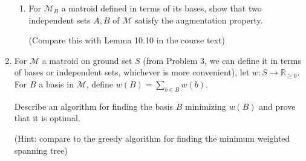 \documentclass[11pt,letterpaper]{article}
\begin{document}
\begin{enumerate}
\begin{enumerate}
        \item For $\mathcal{M}_B$ a matroid defined in terms of its bases, show that two independent sets $A,B$ of $\mathcal{M}$ satisfy the augmentation property.
        
        (Compare this with Lemma 10.10 in the course text)
    \end{enumerate}
     
    \item For $\mathcal{M}$ a matroid on ground set $S$ (from Problem 3, we can define it in terms of bases or independent sets, whichever is more convenient), let $w:S \to \mathbb{R}_{\geq 0}$.
    For $B$ a basis in $\mathcal{M}$, define $w(B) = \sum_{b \in B} w(b)$.
    
    Describe an algorithm for finding the basis $B$ minimizing $w(B)$ and prove that it is optimal.
    
    (Hint: compare to the greedy algorithm for finding the minimum weighted spanning tree)

\end{enumerate}    
\end{document}
